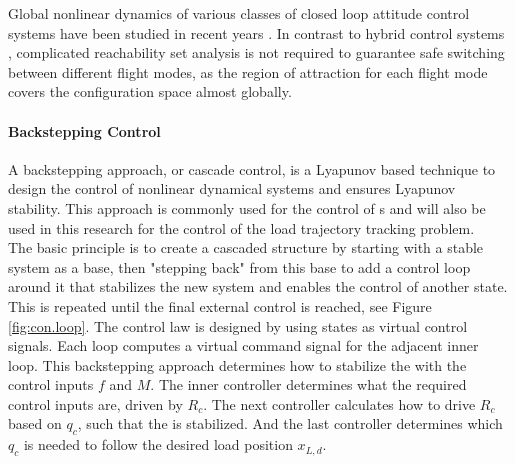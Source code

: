 Global nonlinear dynamics of various classes of closed loop attitude control systems have been studied in recent years \cite{Chaturvedi2011a}.
In contrast to hybrid control systems \cite{Gillula2010}, complicated reachability set analysis is not required to guarantee safe switching between different flight modes, as the region of attraction for each flight mode covers the configuration space almost globally.


\paragraph{Backstepping Control}\label{sec:con.back}
A backstepping approach, or cascade control, is a Lyapunov based technique to design the control of nonlinear dynamical systems and ensures Lyapunov stability. 
This approach is commonly used for the control of s \cite{Mahony2012} and will also be used in this research for the control of the load trajectory tracking problem.\\
The basic principle is to create a cascaded structure by starting with a stable system as a base, then "stepping back" from this base to add a control loop around it that stabilizes the new system and enables the control of another state. 
This is repeated until the final external control is reached, see Figure \ref{fig:con.loop}.
The control law is designed by using states as virtual control signals. 
Each loop computes a virtual command signal for the adjacent inner loop. 
This backstepping approach determines how to stabilize the  with the control inputs $ f $ and $ M $. 
The inner controller determines what the required control inputs are, driven by $ R_c $.  
The next controller calculates how to drive $ R_c $ based on $ q_c $, such that the  is stabilized.
And the last controller determines which $ q_c $ is needed to follow the desired load position $ x_{L,d} $.

